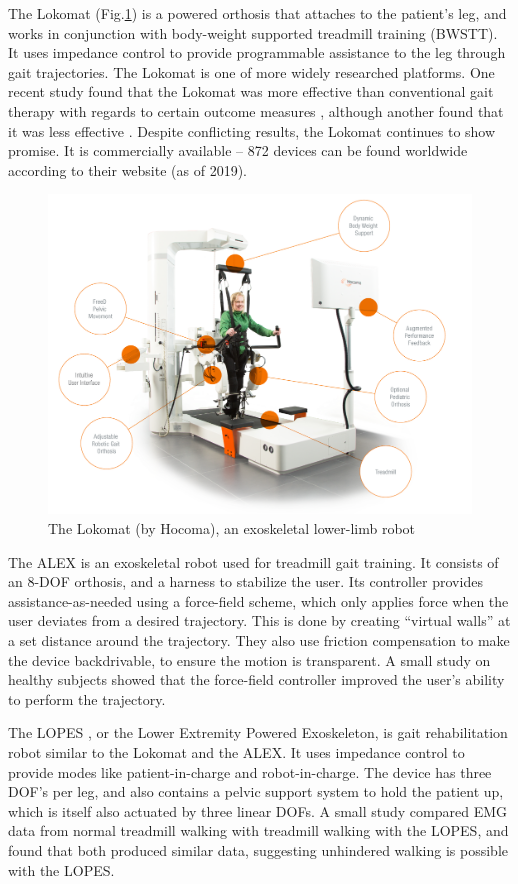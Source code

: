 \documentclass[12pt]{report}
\begin{document}
	The Lokomat (Fig.\ref{fig:Lokomat}) is a powered orthosis that attaches to the patient's leg, and works in conjunction with body-weight supported treadmill training (BWSTT). It uses impedance control to provide programmable assistance to the leg through gait trajectories. The Lokomat is one of more widely researched platforms. One recent study found that the Lokomat was more effective than conventional gait therapy with regards to certain outcome measures \cite{Nam2017}, although another found that it was less effective \cite{Hidler2008}. Despite conflicting results, the Lokomat continues to show promise. It is commercially available -- 872 devices can be found worldwide according to their website (as of 2019).
			
	\begin{figure}[h] 
		\centering
		\includegraphics[width=0.75\linewidth]{Lokomat}
		\caption{The Lokomat (by Hocoma), an exoskeletal lower-limb robot}
		\label{fig:Lokomat}
	\end{figure}
	
	The ALEX \cite{Banala2007} is an exoskeletal robot used for treadmill gait training. It consists of an 8-DOF orthosis, and a harness to stabilize the user. Its controller provides assistance-as-needed using a force-field scheme, which only applies force when the user deviates from a desired trajectory. This is done by creating ``virtual walls'' at a set distance around the trajectory. They also use friction compensation to make the device backdrivable, to ensure the motion is transparent. A small study on healthy subjects showed that the force-field controller improved the user's ability to perform the trajectory. 
	
	The LOPES \cite{Veneman2007}, or the Lower Extremity Powered Exoskeleton, is gait rehabilitation robot similar to the Lokomat and the ALEX. It uses impedance control to provide modes like patient-in-charge and robot-in-charge. The device has three DOF's per leg, and also contains a pelvic support system to hold the patient up, which is itself also actuated by three linear DOFs. A small study compared EMG data from normal treadmill walking with treadmill walking with the LOPES, and found that both produced similar data, suggesting unhindered walking is possible with the LOPES.
	
\end{document}

